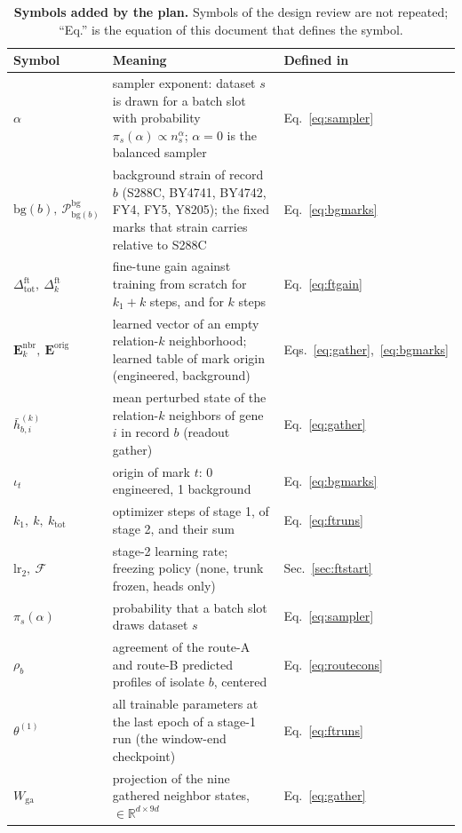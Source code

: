 \begin{table}[htbp]
\centering
\footnotesize
\setlength{\tabcolsep}{4pt}
\caption[]{\textbf{Symbols added by the plan.} Symbols of the design review are not
repeated; ``Eq.'' is the equation of this document that defines the symbol.}
\label{tab:symbols}
\begin{tabular}{>{\raggedright\arraybackslash}p{34mm}>{\raggedright\arraybackslash}p{120mm}>{\raggedright\arraybackslash}p{16mm}}
\toprule
Symbol & Meaning & Defined in \\
\midrule
$\alpha$ & sampler exponent: dataset $s$ is drawn for a batch slot with probability $\pi_s(\alpha) \propto n_s^{\alpha}$; $\alpha = 0$ is the balanced sampler & Eq.~\ref{eq:sampler} \\
$\mathrm{bg}(b),\ \mathcal{P}^{\mathrm{bg}}_{\mathrm{bg}(b)}$ & background strain of record $b$ (S288C, BY4741, BY4742, FY4, FY5, Y8205); the fixed marks that strain carries relative to S288C & Eq.~\ref{eq:bgmarks} \\
$\Delta^{\mathrm{ft}}_{\mathrm{tot}},\ \Delta^{\mathrm{ft}}_{k}$ & fine-tune gain against training from scratch for $k_1 + k$ steps, and for $k$ steps & Eq.~\ref{eq:ftgain} \\
$\mathbf{E}^{\mathrm{nbr}}_{k},\ \mathbf{E}^{\mathrm{orig}}$ & learned vector of an empty relation-$k$ neighborhood; learned table of mark origin (engineered, background) & Eqs.~\ref{eq:gather},~\ref{eq:bgmarks} \\
$\bar h^{(k)}_{b,i}$ & mean perturbed state of the relation-$k$ neighbors of gene $i$ in record $b$ (readout gather) & Eq.~\ref{eq:gather} \\
$\iota_t$ & origin of mark $t$: 0 engineered, 1 background & Eq.~\ref{eq:bgmarks} \\
$k_1,\ k,\ k_{\mathrm{tot}}$ & optimizer steps of stage 1, of stage 2, and their sum & Eq.~\ref{eq:ftruns} \\
$\mathrm{lr}_2,\ \mathcal{F}$ & stage-2 learning rate; freezing policy (none, trunk frozen, heads only) & Sec.~\ref{sec:ftstart} \\
$\pi_s(\alpha)$ & probability that a batch slot draws dataset $s$ & Eq.~\ref{eq:sampler} \\
$\rho_b$ & agreement of the route-A and route-B predicted profiles of isolate $b$, centered & Eq.~\ref{eq:routecons} \\
$\theta^{(1)}$ & all trainable parameters at the last epoch of a stage-1 run (the window-end checkpoint) & Eq.~\ref{eq:ftruns} \\
$W_{\mathrm{ga}}$ & projection of the nine gathered neighbor states, $\in \mathbb{R}^{d \times 9d}$ & Eq.~\ref{eq:gather} \\
\bottomrule
\end{tabular}
\end{table}
